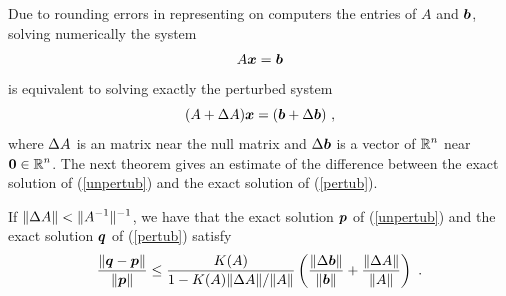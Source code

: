 Due to rounding errors in representing on computers the entries
of $A$ and $\bm{b}$, solving numerically the system
\begin{equation}\label{unpertub}
A\bm{x} = \bm{b}
\end{equation}
is equivalent to solving exactly the perturbed system
\begin{equation}\label{pertub}
(A+\Delta{A})\bm{x} = (\bm{b} + \Delta{\bm{b}}) \ ,
\end{equation}
where $\Delta{A}$ is an \nn matrix near the \nn null
matrix and $\Delta{\bm{b}}$ is a vector of $\displaystyle \mathbb{R}^n$
near $\displaystyle \bm{0}\in \mathbb{R}^n$.
The next theorem gives an estimate of the difference between the exact
solution of (\ref{unpertub}) and the exact solution of
(\ref{pertub}).

\begin{theorem}
If $\displaystyle \|\Delta{A}\| < \|A^{-1}\|^{-1}$, we have that
the exact solution $\bm{p}$ of (\ref{unpertub}) and the exact
solution $\bm{q}$ of (\ref{pertub}) satisfy
\[
\frac{\| \bm{q} - \bm{p} \|}{\| \bm{p} \|} \leq
\frac{K(A)}{1 - K(A) \|\Delta{A}\|/\|A\|}
\left( \frac{\|\Delta{\bm{b}}\|}{\|\bm{b}\|}
+ \frac{\|\Delta{A}\|}{\|A\|} \right) \ .
\]
\end{theorem}

